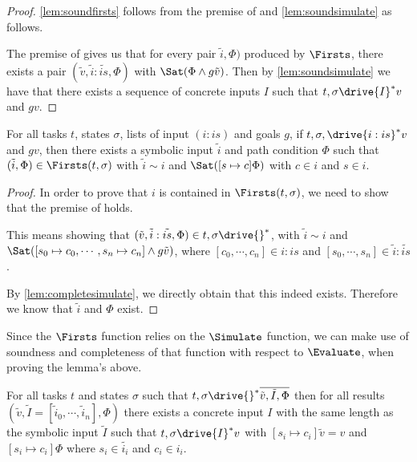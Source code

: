 \begin{proof}
  \cref{lem:soundfirsts} follows from the premise of  and \cref{lem:soundsimulate} as follows.

  The premise of  gives us that for every pair $\tilde{i},\Phi)$ produced by $\Firsts$,
  there exists a pair $(\tilde{v},\tilde{i}:\tilde{is},\Phi)$ with $\Sat(\Phi\land g \tilde{v})$.
  Then by \cref{lem:soundsimulate} we have that there exists a sequence of concrete inputs $I$ such that
  $t,\sigma\drive{I}^*v$ and $g v$.
\end{proof}

\begin{lemma}
  \label{lem:completefirsts}
  For all tasks $t$, states $\sigma$, lists of input $(i:is)$ and goals $g$,
  if $t,\sigma,\drive{i:is}^*v$ and $g v$, then there exists a symbolic input $\tilde{i}$ and path condition $\Phi$
  such that $(\tilde{i},\Phi)\in\Firsts(t,\sigma)$ with $\tilde{i}\sim i$ and $\Sat([s\mapsto c]\Phi)$ with $c\in i$ and $s\in i$.
\end{lemma}

\begin{proof}
  In order to prove that $i$ is contained in $\Firsts(t,\sigma)$, we need to show that the premise of  holds.

  This means showing that $(\tilde{v},\tilde{i}:\tilde{is},\Phi)\in t,\sigma\drive{}^*$, with $\tilde{i}\sim i$ and $\Sat([s_0\mapsto c_0,\cdots,s_n\mapsto c_n]\land g\tilde{v})$, where $[c_0,\cdots,c_n]\in i:is$ and $[s_0,\cdots,s_n]\in \tilde{i}:\tilde{is}$.

  By \cref{lem:completesimulate}, we directly obtain that this indeed exists. Therefore we know that $\tilde{i}$ and $\Phi$ exist.
\end{proof}


Since the $\Firsts$ function relies on the $\Simulate$ function, we can make use of soundness and completeness of that function with respect to $\Evaluate$, when proving the lemma's above.

\begin{lemma}
  \label{lem:soundsimulate}
  For all tasks $t$ and states $\sigma$
  such that $t,\sigma\drive{}^*\overline{\tilde{v},\tilde{I},\Phi}$
  then for all results $(\tilde{v},\tilde{I}=[\tilde{i}_0,\cdots,\tilde{i}_n],\Phi)$
  there exists a concrete input $I$ with the same length as the symbolic input $\tilde{I}$
  such that $t,\sigma\drive{I}^*v$
  with $[s_i\mapsto c_i]\tilde{v}=v$ and $[s_i\mapsto c_i]\Phi$
  where $s_i\in\tilde{i_i}$ and $c_i\in i_i$.
\end{lemma}

